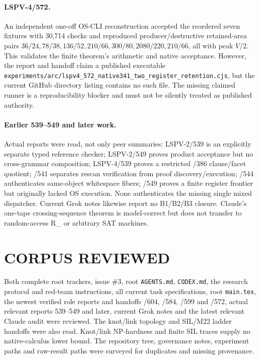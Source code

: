 \documentclass[11pt]{article}
\newcommand{\Rmix}{R_{\mathrm{mix341}}}
\begin{document}
\paragraph{LSPV-4/572.}
An independent one-off OS-CLI reconstruction accepted the reordered seven
fixtures with 30,714 checks and reproduced producer/destructive retained-area
pairs $36/24,78/38,136/52,210/66,300/80,2080/220,210/66$, all with peak
$V/2$.  This validates the finite theorem's arithmetic and native acceptance.
However, the report and handoff claim a published executable
\texttt{experiments/arc/lspv4\_572\_native341\_two\_register\_retention.cjs},
but the current GitHub directory listing contains no such file.  The missing
claimed runner is a reproducibility blocker and must not be silently treated as
published authority.

\paragraph{Earlier 539--549 and later work.}
Actual reports were read, not only peer summaries: LSPV-2/539 is an explicitly
separate typed reference checker; LSPV-2/549 proves product acceptance but no
cross-grammar composition; LSPV-4/539 proves a restricted /386 clause/facet
quotient; /541 separates rescan verification from proof discovery/execution;
/544 authenticates same-object whitespace fibers; /549 proves a finite
register frontier but originally lacked OS execution.  None authenticates the
missing single mixed dispatcher.  Current Grok notes likewise report no B1/B2/B3
closure.  Claude's one-tape crossing-sequence theorem is model-correct but does
not transfer to random-access \Rmix{} or arbitrary SAT machines.

\section{CORPUS REVIEWED}

Both complete root trackers, issue \#3, root \texttt{AGENTS.md},
\texttt{CODEX.md}, the research protocol and red-team instructions, all current
task specifications, root \texttt{main.tex}, the newest verified role reports
and handoffs /604, /584, /599 and /572, actual relevant reports 539--549 and
later, current Grok notes and the latest relevant Claude audit were reviewed.
The knot/link topology and SIL/M22 ladder handoffs were also read.  Knot/link
NP-hardness and finite SIL traces supply no native-calculus lower bound.  The
repository tree, governance notes, experiment paths and raw-result paths were
surveyed for duplicates and missing provenance.
\end{document}
